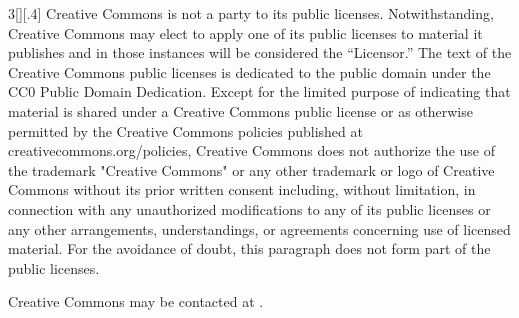 \documentclass[8pt,cleardoubleempty]{scrbook}
\newcommand\urlsplit[1]{{\seqsplit{\tt #1}}}
\begin{document}
\begin{multicols}{3}[][.4\paperwidth]
Creative Commons is not a party to its public
licenses. Notwithstanding, Creative Commons may elect to apply one of
its public licenses to material it publishes and in those instances
will be considered the “Licensor.” The text of the Creative Commons
public licenses is dedicated to the public domain under the CC0 Public
Domain Dedication. Except for the limited purpose of indicating that
material is shared under a Creative Commons public license or as
otherwise permitted by the Creative Commons policies published at
creativecommons.org/policies, Creative Commons does not authorize the
use of the trademark "Creative Commons" or any other trademark or logo
of Creative Commons without its prior written consent including,
without limitation, in connection with any unauthorized modifications
to any of its public licenses or any other arrangements,
understandings, or agreements concerning use of licensed material. For
the avoidance of doubt, this paragraph does not form part of the
public licenses.

\smallskip

Creative Commons may be contacted at \urlsplit{creativecommons.org}.

\end{multicols}
\end{document}
